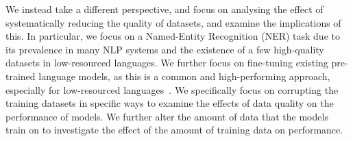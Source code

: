 \documentclass{article}
\begin{document}



We instead take a different perspective, and focus on analysing the effect of systematically reducing the quality of datasets, and examine the implications of this. In particular, we focus on a Named-Entity Recognition (NER) task due to its prevalence in many NLP systems and the existence of a few high-quality datasets in low-resourced languages. We further focus on fine-tuning existing pre-trained language models, as this is a common and high-performing approach, especially for low-resourced languages~\citep{ogueji2021Small,adelani2021MasakhaNER,alabi2022Multilingual}. We specifically focus on corrupting the training datasets in specific ways to examine the effects of data quality on the performance of models. We further alter the amount of data that the models train on to investigate the effect of the amount of training data on performance.

\end{document}
